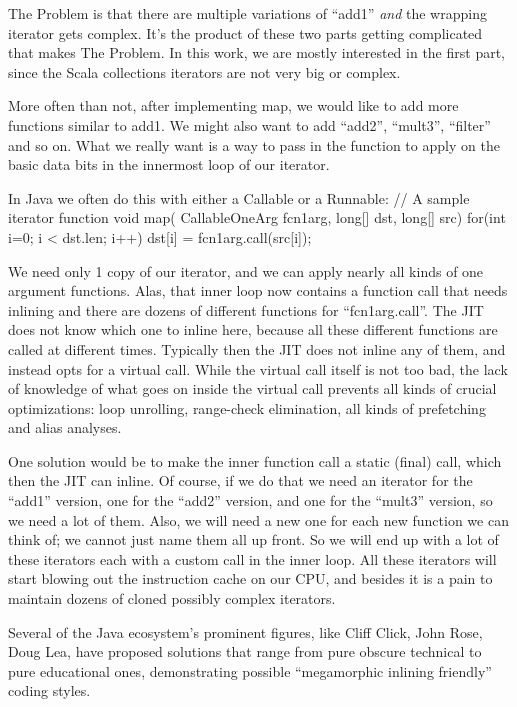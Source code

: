 The Problem is that there are multiple variations of ``add1'' \emph{and}
the wrapping iterator gets complex.  It’s the product of these two parts getting
complicated that makes The Problem. In this work, we are mostly interested in
the first part, since the Scala collections iterators are not very big or
complex.

More often than not, after implementing map, we would like to add more
functions similar to add1. We might also want to add ``add2'', ``mult3'',
``filter'' and so on. What we really want is a way to pass in the function to
apply on the basic data bits in the innermost loop of our iterator.

In Java we often do this with either a Callable or a Runnable:
// A sample iterator function
void map( CallableOneArg fcn1arg, long[] dst, long[] src) {
  for(int i=0; i < dst.len; i++)
    dst[i] = fcn1arg.call(src[i]);
}
  
We need only 1 copy of our iterator, and we can apply nearly all kinds of one
argument functions. Alas, that inner loop now contains a function call that
needs inlining and there are dozens of different functions for ``fcn1arg.call''.
The JIT does not know which one to inline here, because all these different
functions are called at different times.  Typically then the JIT does not inline
any of them, and instead opts for a virtual call.  While the virtual call
itself is not too bad, the lack of knowledge of what goes on inside the virtual
call prevents all kinds of crucial optimizations: loop unrolling, range-check
elimination, all kinds of prefetching and alias analyses.

One solution  would be to make the inner function call a static (final)
call, which then the JIT can inline. Of course, if we do that we need an
iterator for the ``add1'' version, one for the ``add2'' version, and one for the
``mult3'' version, so we need a lot of them. Also, we will need a new one for
each new function we can think of; we cannot just name them all up front.  So we
will end up with a lot of these iterators each with a custom call in the inner
loop. All these iterators will start blowing out the instruction cache on our
CPU, and besides it is a pain to maintain dozens of cloned possibly complex
iterators.

Several of the Java ecosystem's prominent figures, like Cliff Click, John Rose,
Doug Lea, have proposed solutions that range from pure obscure technical to pure
educational ones, demonstrating possible ``megamorphic inlining friendly''
coding styles.

